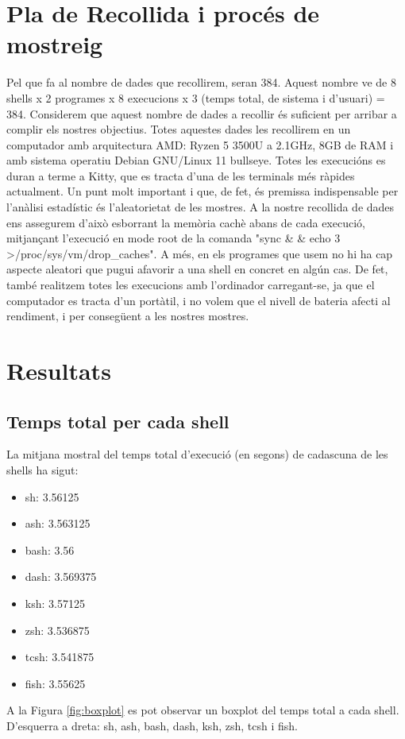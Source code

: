 \documentclass[12pt]{article}
\begin{document}
\section{Pla de Recollida i procés de mostreig}
Pel que fa al nombre de dades que recollirem, seran 384. Aquest nombre ve de 8 shells x 2 programes x 8 
execucions x 3 (temps total, de sistema i d'usuari) = 384. Considerem que aquest nombre de dades a 
recollir és suficient per arribar a complir els nostres objectius. Totes aquestes dades les recollirem en 
un computador amb arquitectura AMD: Ryzen 5 3500U a 2.1GHz, 8GB de RAM i amb sistema operatiu Debian GNU/Linux 11 bullseye. 
Totes les execucións es duran a terme a Kitty, que es tracta d'una de les terminals més ràpides actualment.
Un punt molt important i que, de fet, és premissa indispensable per l'anàlisi estadístic és l'aleatorietat
de les mostres. A la nostre recollida de dades ens assegurem d'això esborrant la memòria cachè abans de cada execució, 
mitjançant l'execució en mode root de la comanda "sync \& \& echo 3 \textgreater /proc/sys/vm/drop\_caches". A més,
en els programes que usem no hi ha cap aspecte aleatori que pugui afavorir a una shell en concret en algún cas. De fet,
també realitzem totes les execucions amb l'ordinador carregant-se, ja que el computador es tracta d'un portàtil, i no 
volem que el nivell de bateria afecti al rendiment, i per consegüent a les nostres mostres.

\section{Resultats}
\subsection{Temps total per cada shell}
La mitjana mostral del temps total d'execució (en segons) de cadascuna de les shells ha sigut:
\begin{itemize}
  \item sh: 3.56125
  \item ash: 3.563125
  \item bash: 3.56 
  \item dash: 3.569375
  \item ksh: 3.57125
  \item zsh: 3.536875
  \item tcsh: 3.541875
  \item fish: 3.55625
\end{itemize}

A la Figura \ref{fig:boxplot} es pot observar un boxplot del temps total a cada shell. D'esquerra a dreta: sh, ash,
bash, dash, ksh, zsh, tcsh i fish.
\end{document}
